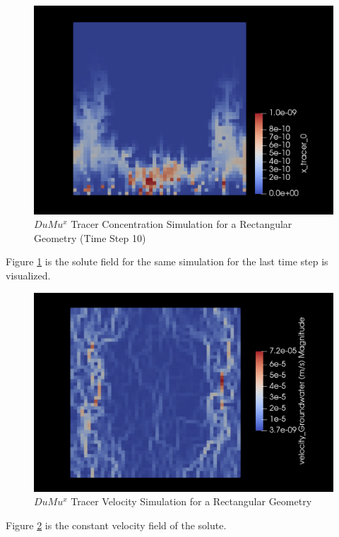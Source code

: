 \begin{figure}[h]
\centering
\includegraphics[width=162mm]{tracer_2}
\caption{\footnotesize $DuMu^x$ Tracer Concentration Simulation for a Rectangular Geometry (Time Step 10)}
\label{fig:tracer_2}
\end{figure}
Figure \ref{fig:tracer_2} is the solute field for the same simulation for the last time step is visualized.\\
\begin{figure}[h]
\centering
\includegraphics[width=162mm]{tracer_velocity}
\caption{\footnotesize $DuMu^x$ Tracer Velocity Simulation for a Rectangular Geometry}
\label{fig:tracer_velocity}
\end{figure}
Figure \ref{fig:tracer_velocity} is the constant velocity field of the solute.\\